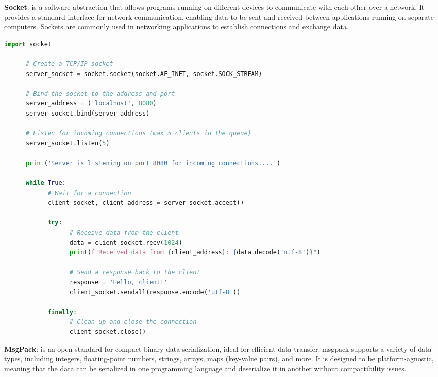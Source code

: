 \begin{multicols}{2}
      \textbf{Socket}: is a software abstraction that allows programs running on different devices to
      communicate with each other over a network. It provides a standard interface for network
      communication, enabling data to be sent and received between applications running on separate
      computers. Sockets are commonly used in networking applications to establish connections and
      exchange data.
\end{multicols}

\begin{lstlisting}[language=Python, caption=TCP Server Example Using Sockets in Python]
      import socket

      # Create a TCP/IP socket
      server_socket = socket.socket(socket.AF_INET, socket.SOCK_STREAM)

      # Bind the socket to the address and port
      server_address = ('localhost', 8080)
      server_socket.bind(server_address)

      # Listen for incoming connections (max 5 clients in the queue)
      server_socket.listen(5)

      print('Server is listening on port 8080 for incoming connections....')

      while True:
            # Wait for a connection
            client_socket, client_address = server_socket.accept()

            try:
                  # Receive data from the client
                  data = client_socket.recv(1024)
                  print(f"Received data from {client_address}: {data.decode('utf-8')}")

                  # Send a response back to the client
                  response = 'Hello, client!'
                  client_socket.sendall(response.encode('utf-8'))

            finally:
                  # Clean up and close the connection
                  client_socket.close()
\end{lstlisting}

\begin{multicols}{2}
      \textbf{MsgPack}: is an open standard for compact binary data serialization, ideal for efficient data transfer.
      \acrshort{msgpack} supports a variety of data types, including integers, floating-point numbers, strings,
      arrays, maps (key-value pairs), and more. It is designed to be platform-agnostic, meaning that the data can be
      serialized in one programming language and deserialize it in another without compactibility issues.
\end{multicols}

